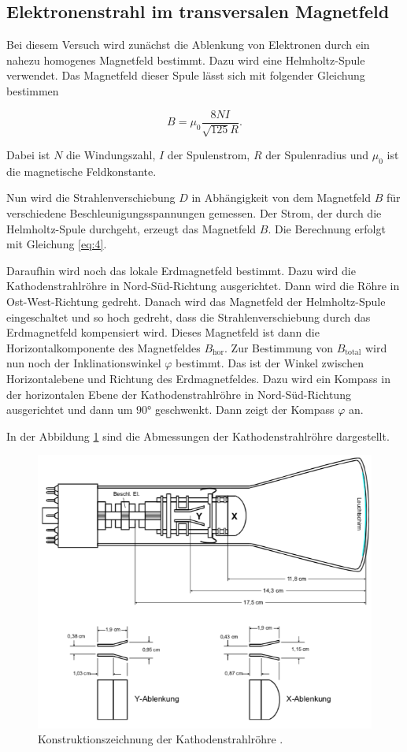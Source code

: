 \subsection{Elektronenstrahl im transversalen Magnetfeld}

Bei diesem Versuch wird zunächst die Ablenkung von Elektronen durch ein nahezu homogenes
Magnetfeld bestimmt. Dazu wird eine Helmholtz-Spule verwendet. Das Magnetfeld dieser
Spule lässt sich mit folgender Gleichung bestimmen

\begin{equation}
  B = \mu_0 \frac{8 N I}{\sqrt{125} R}.
  \label{eq:4}
\end{equation}

Dabei ist $N$ die Windungszahl, $I$ der Spulenstrom, $R$ der Spulenradius und
$\mu_0$ ist die magnetische Feldkonstante.

Nun wird die Strahlenverschiebung $D$ in Abhängigkeit von dem Magnetfeld $B$
für verschiedene Beschleunigungsspannungen gemessen.
Der Strom, der durch die Helmholtz-Spule durchgeht, erzeugt das Magnetfeld $B$.
Die Berechnung erfolgt mit Gleichung \ref{eq:4}.

Daraufhin wird noch das lokale Erdmagnetfeld bestimmt. Dazu wird die Kathodenstrahlröhre
in Nord-Süd-Richtung ausgerichtet. Dann wird die Röhre in Ost-West-Richtung gedreht.
Danach wird das Magnetfeld der Helmholtz-Spule eingeschaltet und so hoch gedreht, dass
die Strahlenverschiebung durch das Erdmagnetfeld kompensiert wird. Dieses Magnetfeld ist dann
die Horizontalkomponente des Magnetfeldes $B_\text{hor}$.
Zur Bestimmung von $B_\text{total}$ wird nun noch der Inklinationswinkel $\varphi$
bestimmt. Das ist der Winkel zwischen Horizontalebene und Richtung des Erdmagnetfeldes. Dazu wird
ein Kompass in der horizontalen Ebene der Kathodenstrahlröhre in Nord-Süd-Richtung ausgerichtet
und dann um $90°$ geschwenkt. Dann zeigt der Kompass $\varphi$ an.


In der Abbildung \ref{abb:5} sind die Abmessungen der Kathodenstrahlröhre dargestellt.

\begin{figure}[H]
  \centering
  \includegraphics[width=\textwidth]{content/Roehre.png}
  \caption{Konstruktionszeichnung der Kathodenstrahlröhre \cite{1}.}
  \label{abb:5}
\end{figure}
